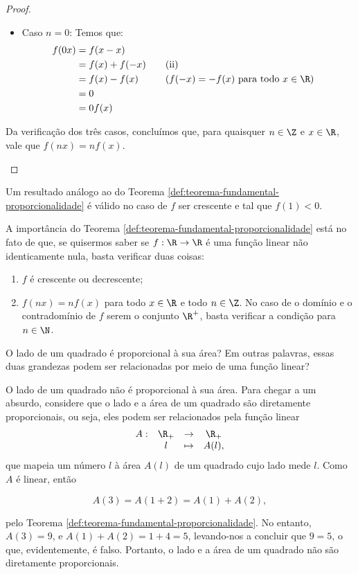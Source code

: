 \begin{proof}
\begin{itemize}
\begin{itemize}
      \item Caso $n=0$: Temos que:
      \begin{alignat*}{3}
        f(0x) &= f(x-x) \\
        &= f(x)+f(-x) && \quad\text{(ii)}\\
        &= f(x)-f(x) && \quad\text{($f(-x) = -f(x)$ para todo $x \in \R$)}\\
        &= 0\\
        &= 0f(x)
      \end{alignat*}
    \end{itemize}

    Da verificação dos três casos, concluímos que, para quaisquer $n\in\Z$ e $x\in\R$, vale que $f(nx)=nf(x)$.
  \end{itemize}
\end{proof}

\begin{remark}
    Um resultado análogo ao do Teorema \ref{def:teorema-fundamental-proporcionalidade} é válido
    no caso de $f$ ser crescente e tal que $f(1) < 0$.
\end{remark}

A importância do Teorema \ref{def:teorema-fundamental-proporcionalidade} 
está no fato de que, se quisermos saber se $f: \R \to \R$ é uma função linear não identicamente nula,
basta verificar duas coisas:
%
\begin{enumerate}[1.]
  \item $f$ é crescente ou decrescente;
  \item $f(nx) = n f(x)$ para todo $x \in \R$ e todo $n \in \Z$. No
  caso de o domínio e o contradomínio de $f$ serem o conjunto $\R^+$, basta verificar a condição
  para $n \in \N$.
\end{enumerate}

\begin{example}
O lado de um quadrado é proporcional à sua área? Em outras palavras,
essas duas grandezas podem ser relacionadas por meio de uma função
linear?
\end{example}

\begin{solution}
  O lado de um quadrado não é proporcional à sua área.
  Para chegar a um absurdo, 
  considere que o lado e a área de um quadrado são diretamente proporcionais, ou seja, eles podem
  ser relacionados pela função linear
  \begin{equation*}
  \begin{array}{cccc}
    A : & \R_+ & \to     & \R_+ \\
        &  l & \mapsto & A(l),
  \end{array}
  \end{equation*}
  que mapeia um número $l$ à área $A(l)$ de um quadrado cujo lado mede $l$.
  Como $A$ é linear, então

  $$A(3) = A(1+2)=A(1)+A(2),$$

  \noindent pelo Teorema \ref{def:teorema-fundamental-proporcionalidade}. 
  No entanto, $A(3) = 9$, e $A(1)+A(2) = 1+4 = 5$, levando-nos a concluir que $9=5$, o que, evidentemente,
  é falso. Portanto, o lado e a área de um quadrado não são diretamente proporcionais.
\end{solution}